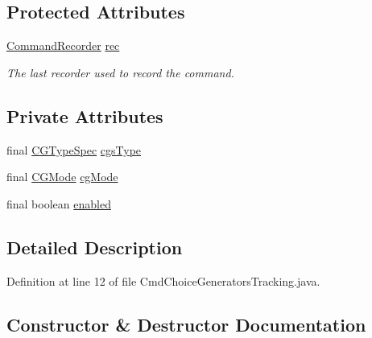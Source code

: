\subsection*{Protected Attributes}
\begin{DoxyCompactItemize}
\item 
\hyperlink{classgov_1_1nasa_1_1jpf_1_1inspector_1_1client_1_1_command_recorder}{Command\+Recorder} \hyperlink{classgov_1_1nasa_1_1jpf_1_1inspector_1_1client_1_1_client_command_af4246f2427035c72a6af45a2c61361f7}{rec}
\begin{DoxyCompactList}\small\item\em The last recorder used to record the command. \end{DoxyCompactList}\end{DoxyCompactItemize}
\subsection*{Private Attributes}
\begin{DoxyCompactItemize}
\item 
final \hyperlink{enumgov_1_1nasa_1_1jpf_1_1inspector_1_1client_1_1commands_1_1_cmd_choice_generators_tracking_1_1_c_g_type_spec}{C\+G\+Type\+Spec} \hyperlink{classgov_1_1nasa_1_1jpf_1_1inspector_1_1client_1_1commands_1_1_cmd_choice_generators_tracking_a407320f69637c99aa4a82d78cfc5ae07}{cgs\+Type}
\item 
final \hyperlink{enumgov_1_1nasa_1_1jpf_1_1inspector_1_1interfaces_1_1_choice_generators_interface_1_1_c_g_mode}{C\+G\+Mode} \hyperlink{classgov_1_1nasa_1_1jpf_1_1inspector_1_1client_1_1commands_1_1_cmd_choice_generators_tracking_ab6410ab4d33fab56087f59dbd898824b}{cg\+Mode}
\item 
final boolean \hyperlink{classgov_1_1nasa_1_1jpf_1_1inspector_1_1client_1_1commands_1_1_cmd_choice_generators_tracking_a71cada56aa7d86442e42fa24303eadaa}{enabled}
\end{DoxyCompactItemize}


\subsection{Detailed Description}


Definition at line 12 of file Cmd\+Choice\+Generators\+Tracking.\+java.



\subsection{Constructor \& Destructor Documentation}
